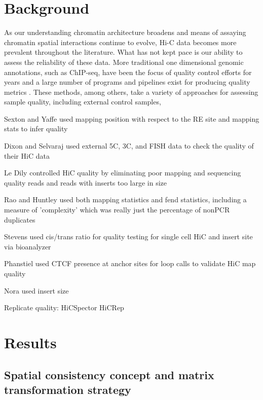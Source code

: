 \section{Background}

As our understanding chromatin architecture broadens and means of assaying chromatin spatial interactions continue to evolve, Hi-C data becomes more prevalent throughout the literature. What has not kept pace is our ability to assess the reliability of these data. More traditional one dimensional genomic annotations, such as ChIP-seq, have been the focus of quality control efforts for years and a large number of programs and pipelines exist for producing quality metrics \cite{planet_htseqtools:_2012,diaz_chance:_2012, carroll_impact_2014,marinov_large-scale_2014,yu_chipseeker:_2015,qin_chilin:_2016}. These methods, among others, take a variety of approaches for assessing sample quality, including external control samples, 

Sexton and Yaffe used mapping position with respect to the RE site and mapping stats to infer quality\cite{sexton_three-dimensional_2012}

Dixon and Selvaraj used external 5C, 3C, and FISH data to check the quality of their HiC data \cite{dixon_topological_2012}

Le Dily controlled HiC quality by eliminating poor mapping and sequencing quality reads and reads with inserts too large in size \cite{le_dily_distinct_2014}

Rao and Huntley used both mapping statistics and fend statistics, including a measure of 'complexity' which was really just the percentage of nonPCR duplicates \cite{rao_3d_2014}

Stevens used cis/trans ratio for quality testing for single cell HiC and insert site via bioanalyzer \cite{stevens_3d_2017}

Phanstiel used CTCF presence at anchor sites for loop calls to validate HiC map quality \cite{phanstiel_static_2017}

Nora used insert size \cite{nora_targeted_2017}


Replicate quality:
HiCSpector \cite{yan_hic-spector:_2017}
HiCRep \cite{yang_hicrep:_2017}


\section{Results}
\subsection{Spatial consistency concept and matrix transformation strategy}


